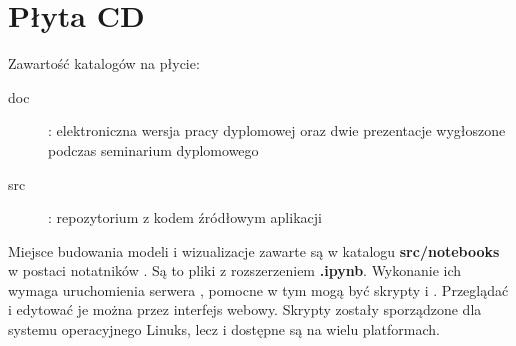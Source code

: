 \chapter{Płyta CD}\label{app:plyta}

\begin{figure}[htb]
\makebox[\textwidth]{\framebox[12.8cm]{\rule{0pt}{12.8cm}}}
\end{figure}
\pagebreak

Zawartość katalogów na płycie:
\begin{description}
    \item[doc] : elektroniczna wersja pracy dyplomowej oraz dwie prezentacje wygłoszone podczas seminarium dyplomowego
    \item[src] : repozytorium z kodem źródłowym aplikacji
\end{description}

Miejsce budowania modeli i wizualizacje zawarte są w katalogu \textbf{src/notebooks} w postaci notatników . Są to pliki z rozszerzeniem \textbf{.ipynb}. Wykonanie ich wymaga uruchomienia serwera , pomocne w tym mogą być skrypty  i . Przeglądać i edytować je można przez interfejs webowy. Skrypty zostały sporządzone dla systemu operacyjnego Linuks, lecz  i  dostępne są na wielu platformach.

